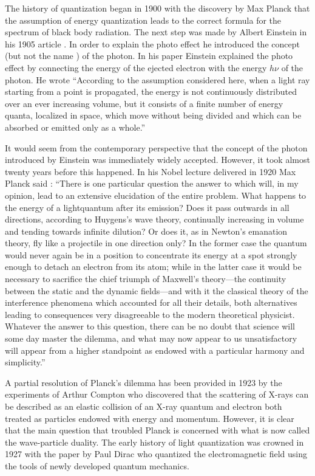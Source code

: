 \documentclass[twocolumn,aps,pra,10pt]{revtex4-1}
\begin{document}
The history of quantization began in 1900 with the discovery by Max Planck \cite{planck,nau} that the assumption of energy quantization leads to the correct formula for the spectrum of black body radiation. The next step was made by Albert Einstein in his 1905 article \cite{ae1}. In order to explain the photo effect he introduced the concept (but not the name \cite{gnl}) of the photon. In his paper Einstein explained the photo effect by connecting the energy of the ejected electron with the energy $h\nu$ of the photon. He wrote ``According to the assumption considered here, when a light ray starting from a point is propagated, the energy is not continuously distributed over an ever increasing volume, but it consists of a finite number of energy quanta, localized in space, which move without being divided and which can be absorbed or emitted only as a whole.''

It would seem from the contemporary perspective that the concept of the photon introduced by Einstein was immediately widely accepted. However, it took almost twenty years before this happened. In his Nobel lecture delivered in 1920 Max Planck said \cite{np}:
``There is one particular question the answer to which will, in my opinion, lead to an extensive elucidation of the entire problem. What happens to the energy of a lightquantum after its emission? Does it pass outwards in all directions, according to Huygens’s wave theory, continually increasing in volume and tending towards infinite dilution? Or does it, as in Newton’s emanation theory, fly like a projectile in one direction only? In the former case the quantum would never again be in a position to concentrate its energy at a spot strongly enough to detach an electron from its atom; while in the latter case it would be necessary to sacrifice the chief triumph of Maxwell’s theory—the continuity between the static and the dynamic fields—and with it the classical theory of the interference phenomena which accounted for all their details, both alternatives leading to consequences very disagreeable to the modern theoretical physicist. Whatever the answer to this question, there can be no doubt that science will some day master the dilemma, and what may now appear to us unsatisfactory will appear from a higher standpoint as endowed with a particular harmony and simplicity.''

A partial resolution of Planck's dilemma has been provided in 1923 by the experiments of Arthur Compton \cite{ac,ac1} who discovered that the scattering of X-rays can be described as an elastic collision of an X-ray quantum and electron both treated as particles endowed with energy and momentum. However, it is clear that the main question that troubled Planck is concerned with what is now called the wave-particle duality. The early history of light quantization was crowned in 1927 with the paper by Paul Dirac \cite{pamd} who quantized the electromagnetic field using the tools of newly developed quantum mechanics.
\end{document}
